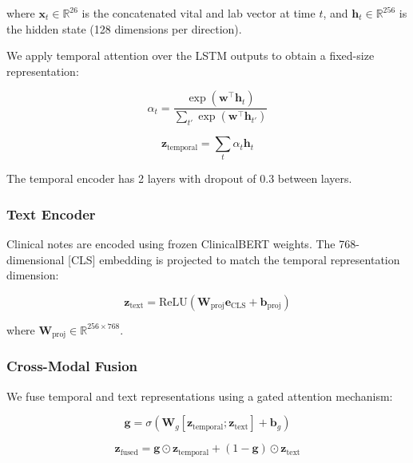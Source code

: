 where $\mathbf{x}_t \in \mathbb{R}^{26}$ is the concatenated vital and lab vector at time $t$, and $\mathbf{h}_t \in \mathbb{R}^{256}$ is the hidden state (128 dimensions per direction).

We apply temporal attention over the LSTM outputs to obtain a fixed-size representation:

\begin{equation}
\alpha_t = \frac{\exp(\mathbf{w}^\top \mathbf{h}_t)}{\sum_{t'} \exp(\mathbf{w}^\top \mathbf{h}_{t'})}
\end{equation}

\begin{equation}
\mathbf{z}_{\text{temporal}} = \sum_t \alpha_t \mathbf{h}_t
\end{equation}

The temporal encoder has 2 layers with dropout of 0.3 between layers.

\subsubsection{Text Encoder}

Clinical notes are encoded using frozen ClinicalBERT weights. The 768-dimensional [CLS] embedding is projected to match the temporal representation dimension:

\begin{equation}
\mathbf{z}_{\text{text}} = \text{ReLU}(\mathbf{W}_{\text{proj}} \mathbf{e}_{\text{CLS}} + \mathbf{b}_{\text{proj}})
\end{equation}

where $\mathbf{W}_{\text{proj}} \in \mathbb{R}^{256 \times 768}$.

\subsubsection{Cross-Modal Fusion}

We fuse temporal and text representations using a gated attention mechanism:

\begin{equation}
\mathbf{g} = \sigma(\mathbf{W}_g [\mathbf{z}_{\text{temporal}}; \mathbf{z}_{\text{text}}] + \mathbf{b}_g)
\end{equation}

\begin{equation}
\mathbf{z}_{\text{fused}} = \mathbf{g} \odot \mathbf{z}_{\text{temporal}} + (1 - \mathbf{g}) \odot \mathbf{z}_{\text{text}}
\end{equation}

